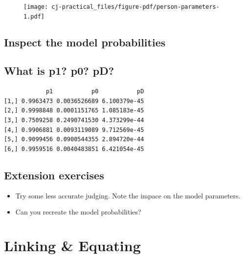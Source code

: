 \documentclass[
  letterpaper,
  DIV=11,
  numbers=noendperiod]{scrreprt}
\newenvironment{Shaded}{\begin{snugshade}}{\end{snugshade}}
\newcommand{\FunctionTok}[1]{\textcolor[rgb]{0.28,0.35,0.67}{#1}}
\newcommand{\NormalTok}[1]{\textcolor[rgb]{0.00,0.23,0.31}{#1}}
\newcommand{\SpecialCharTok}[1]{\textcolor[rgb]{0.37,0.37,0.37}{#1}}
\providecommand{\tightlist}{%
  \setlength{\itemsep}{0pt}\setlength{\parskip}{0pt}}\usepackage{longtable,booktabs,array}
\begin{document}
\begin{figure}[H]

{\centering \texttt{[image: cj-practical\_files/figure-pdf/person-parameters-1.pdf]}

}

\end{figure}

\hypertarget{inspect-the-model-probabilities}{%
\section{Inspect the model
probabilities}\label{inspect-the-model-probabilities}}

\hypertarget{what-is-p1-p0-pd}{%
\section{What is p1? p0? pD?}\label{what-is-p1-p0-pd}}

\begin{Shaded}
\end{Shaded}

\begin{verbatim}
            p1           p0           pD
[1,] 0.9963473 0.0036526689 6.100379e-45
[2,] 0.9998848 0.0001151765 1.085183e-45
[3,] 0.7509258 0.2490741530 4.373299e-44
[4,] 0.9906881 0.0093119089 9.712569e-45
[5,] 0.9099456 0.0900544355 2.894720e-44
[6,] 0.9959516 0.0040483851 6.421054e-45
\end{verbatim}

\hypertarget{extension-exercises}{%
\section{Extension exercises}\label{extension-exercises}}

\begin{itemize}
\tightlist
\item
  Try some less accurate judging. Note the impace on the model
  parameters.
\item
  Can you recreate the model probabilities?
\end{itemize}

\hypertarget{linking-equating}{%
\chapter{Linking \& Equating}\label{linking-equating}}
\end{document}
